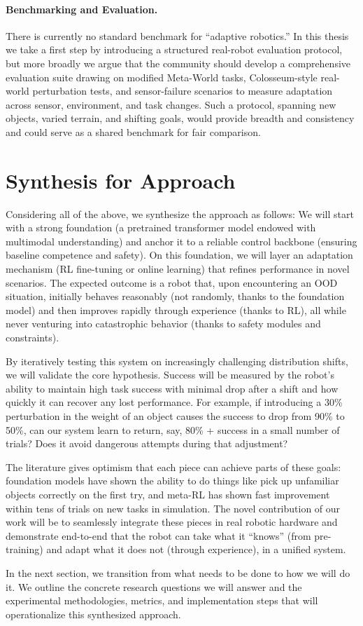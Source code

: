\paragraph{Benchmarking and Evaluation.}
There is currently no standard benchmark for ``adaptive robotics.'' In this thesis we take a first step by introducing a structured real-robot evaluation protocol, but more broadly we argue that the community should develop a comprehensive evaluation suite drawing on modified Meta-World tasks, Colosseum-style real-world perturbation tests, and sensor-failure scenarios to measure adaptation across sensor, environment, and task changes. Such a protocol, spanning new objects, varied terrain, and shifting goals, would provide breadth and consistency and could serve as a shared benchmark for fair comparison.

\section{Synthesis for Approach}

Considering all of the above, we synthesize the approach as follows: We will start with a strong foundation (a pretrained transformer model endowed with multimodal understanding) and anchor it to a reliable control backbone (ensuring baseline competence and safety). On this foundation, we will layer an adaptation mechanism (\ac{RL} fine-tuning or online learning) that refines performance in novel scenarios. The expected outcome is a robot that, upon encountering an \ac{OOD} situation, initially behaves reasonably (not randomly, thanks to the foundation model) and then improves rapidly through experience (thanks to \ac{RL}), all while never venturing into catastrophic behavior (thanks to safety modules and constraints).

By iteratively testing this system on increasingly challenging distribution shifts, we will validate the core hypothesis. Success will be measured by the robot’s ability to maintain high task success with minimal drop after a shift and how quickly it can recover any lost performance. For example, if introducing a 30\% perturbation in the weight of an object causes the success to drop from 90\% to 50\%, can our system learn to return, say, 80\% + success in a small number of trials? Does it avoid dangerous attempts during that adjustment?

The literature gives optimism that each piece can achieve parts of these goals: foundation models have shown the ability to do things like pick up unfamiliar objects correctly on the first try, and meta-\ac{RL} has shown fast improvement within tens of trials on new tasks in simulation. The novel contribution of our work will be to seamlessly integrate these pieces in real robotic hardware and demonstrate end-to-end that the robot can take what it ``knows'' (from pre-training) and adapt what it does not (through experience), in a unified system.

In the next section, we transition from what needs to be done to how we will do it. We outline the concrete research questions we will answer and the experimental methodologies, metrics, and implementation steps that will operationalize this synthesized approach.